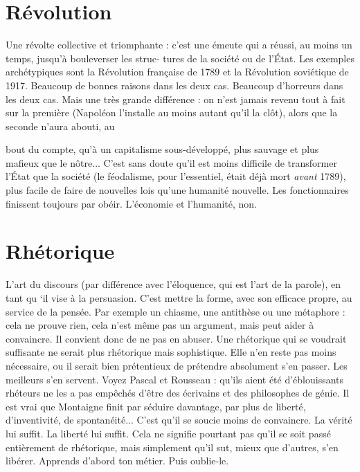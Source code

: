\section{Révolution}
Une révolte collective et triomphante : c’est une émeute qui
a réussi, au moins un temps, jusqu’à bouleverser les struc-
tures de la société ou de l’État. Les exemples archétypiques sont la Révolution
française de 1789 et la Révolution soviétique de 1917. Beaucoup de bonnes
raisons dans les deux cas. Beaucoup d’horreurs dans les deux cas. Mais une très
grande différence : on n’est jamais revenu tout à fait sur la première (Napoléon
l'installe au moins autant qu’il la clôt), alors que la seconde n’aura abouti, au

bout du compte, qu’à un capitalisme sous-développé, plus sauvage et plus
mafieux que le nôtre... C’est sans doute qu’il est moins difficile de transformer
l’État que la société (le féodalisme, pour l'essentiel, était déjà mort {\it avant} 1789),
plus facile de faire de nouvelles lois qu’une humanité nouvelle. Les fonctionnaires
finissent toujours par obéir. L'économie et l'humanité, non.

\section{Rhétorique}
L’art du discours (par différence avec l’éloquence, qui est
l’art de la parole), en tant qu ‘il vise à la persuasion. C’est
mettre la forme, avec son efficace propre, au service de la pensée. Par exemple
un chiasme, une antithèse ou une métaphore : cela ne prouve rien, cela n’est
même pas un argument, mais peut aider à convaincre. Il convient donc de ne
pas en abuser. Une rhétorique qui se voudrait suffisante ne serait plus rhétorique
mais sophistique. Elle n’en reste pas moins nécessaire, ou il serait bien
prétentieux de prétendre absolument s’en passer. Les meilleurs s’en servent.
Voyez Pascal et Rousseau : qu’ils aient été d’éblouissants rhéteurs ne les a pas
empêchés d’être des écrivains et des philosophes de génie. Il est vrai que Montaigne
finit par séduire davantage, par plus de liberté, d’inventivité, de spontanéité...
C’est qu’il se soucie moins de convaincre. La vérité lui suffit. La liberté
lui suffit. Cela ne signifie pourtant pas qu’il se soit passé entièrement de rhétorique,
mais simplement qu’il sut, mieux que d’autres, s’en libérer. Apprends
d’abord ton métier. Puis oublie-le.

